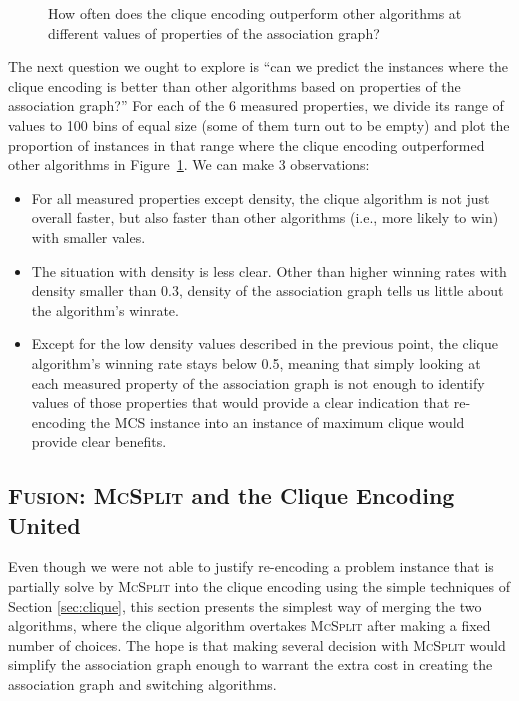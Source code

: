 \documentclass{l4proj}
\theoremstyle{definition}
\theoremstyle{remark}
\begin{document}
\begin{figure}
\begin{subfigure}[t]{0.49\textwidth}
  \end{subfigure}
  \caption{How often does the clique encoding outperform other algorithms at
    different values of properties of the association graph?}
  \label{fig:bins}
\end{figure}

The next question we ought to explore is ``can we predict the instances where
the clique encoding is better than other algorithms based on properties of the
association graph?'' For each of the 6 measured properties, we divide its range
of values to 100 bins of equal size (some of them turn out to be empty) and plot
the proportion of instances in that range where the clique encoding outperformed
other algorithms in Figure~\ref{fig:bins}. We can make 3 observations:
\begin{itemize}
\item For all measured properties except density, the clique algorithm is not
  just overall faster, but also faster than other algorithms (i.e., more likely
  to win) with smaller vales.
\item The situation with density is less clear. Other than higher winning rates
  with density smaller than 0.3, density of the association graph tells us
  little about the algorithm's winrate.
\item Except for the low density values described in the previous point, the
  clique algorithm's winning rate stays below 0.5, meaning that simply looking
  at each measured property of the association graph is not enough to identify
  values of those properties that would provide a clear indication that
  re-encoding the MCS instance into an instance of maximum clique would provide
  clear benefits.
\end{itemize}

\subsection{\textsc{Fusion}: \textsc{McSplit} and the Clique Encoding United}

Even though we were not able to justify re-encoding a problem instance that is
partially solve by \textsc{McSplit} into the clique encoding using the simple
techniques of Section \ref{sec:clique}, this section presents the simplest way of
merging the two algorithms, where the clique algorithm overtakes
\textsc{McSplit} after making a fixed number of choices. The hope is that making
several decision with \textsc{McSplit} would simplify the association graph
enough to warrant the extra cost in creating the association graph and switching
algorithms.
\end{document}
